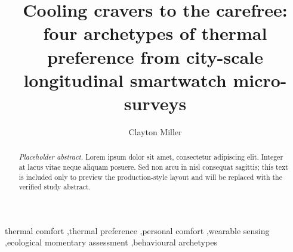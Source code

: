 \documentclass[final,5p,times,twocolumn]{elsarticle}
\begin{document}
\begin{frontmatter}


\title{Cooling cravers to the carefree: four archetypes of thermal preference from city-scale longitudinal smartwatch micro-surveys}

\author[smu]{Clayton Miller}


\begin{abstract}
\textit{Placeholder abstract.} Lorem ipsum dolor sit amet, consectetur adipiscing elit. Integer at lacus vitae neque aliquam posuere. Sed non arcu in nisl consequat sagittis; this text is included only to preview the production-style layout and will be replaced with the verified study abstract.
\end{abstract}



\begin{keyword}
thermal comfort \sep thermal preference \sep personal comfort \sep wearable sensing \sep ecological momentary assessment \sep behavioural archetypes
\end{keyword}

\end{frontmatter}
\end{document}
